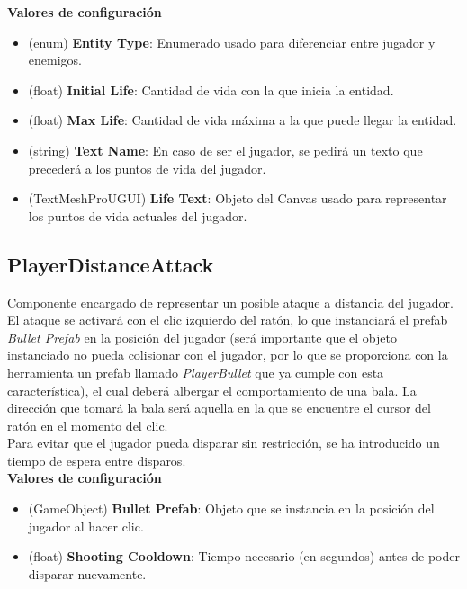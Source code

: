 \textbf{Valores de configuración}
\begin{itemize}
	\item (enum) \textbf{Entity Type}: Enumerado usado para diferenciar entre jugador y enemigos.
	\item (float) \textbf{Initial Life}: Cantidad de vida con la que inicia la entidad.
	\item (float) \textbf{Max Life}: Cantidad de vida máxima a la que puede llegar la entidad.
	\item (string) \textbf{Text Name}: En caso de ser el jugador, se pedirá un texto que precederá a los puntos de vida del jugador.
	\item (TextMeshProUGUI) \textbf{Life Text}: Objeto del Canvas usado para representar los puntos de vida actuales del jugador.
\end{itemize}

\subsection{PlayerDistanceAttack}

Componente encargado de representar un posible ataque a distancia del jugador. El ataque se activará con el clic izquierdo del ratón, lo que instanciará el prefab \textit{Bullet Prefab} en la posición del jugador (será importante que el objeto instanciado no pueda colisionar con el jugador, por lo que se proporciona con la herramienta un prefab llamado \textit{PlayerBullet} que ya cumple con esta característica), el cual deberá albergar el comportamiento de una bala. La dirección que tomará la bala será aquella en la que se encuentre el cursor del ratón en el momento del clic.\\

Para evitar que el jugador pueda disparar sin restricción, se ha introducido un tiempo de espera entre disparos.\\

\textbf{Valores de configuración}
\begin{itemize}
	\item (GameObject) \textbf{Bullet Prefab}: Objeto que se instancia en la posición del jugador al hacer clic.
	\item (float) \textbf{Shooting Cooldown}: Tiempo necesario (en segundos) antes de poder disparar nuevamente.
\end{itemize}
